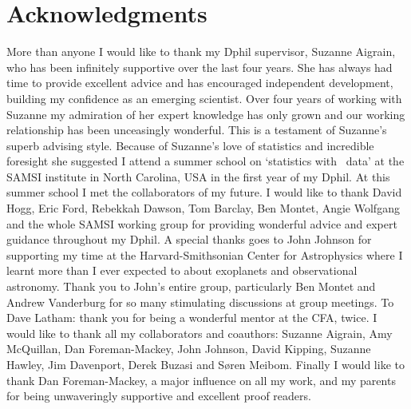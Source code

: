 % 

\cleardoublepage

\section*{Acknowledgments}

More than anyone I would like to thank my Dphil supervisor, Suzanne Aigrain,
who has been infinitely supportive over the last four years.
She has always had time to provide excellent advice and has encouraged
independent development, building my confidence as an emerging scientist.
Over four years of working with Suzanne my admiration of her expert knowledge
has only grown and our working relationship has been unceasingly wonderful.
This is a testament of Suzanne's superb advising style.
Because of Suzanne's love of statistics and incredible foresight she suggested
I attend a summer school on `statistics with \kepler\ data' at the SAMSI
institute in North Carolina, USA in the first year of my Dphil.
At this summer school I met the collaborators of my future.
I would like to thank David Hogg, Eric Ford, Rebekkah Dawson, Tom Barclay, Ben
Montet, Angie Wolfgang and the whole SAMSI working group for providing
wonderful advice and expert guidance throughout my Dphil.
A special thanks goes to John Johnson for supporting my time at the
Harvard-Smithsonian Center for Astrophysics where I learnt more than I ever
expected to about exoplanets and observational astronomy.
Thank you to John's entire group, particularly Ben Montet and Andrew
Vanderburg for so many stimulating discussions at group meetings.
To Dave Latham: thank you for being a wonderful mentor at the CFA, twice.
I would like to thank all my collaborators and coauthors: Suzanne Aigrain, Amy
McQuillan, Dan Foreman-Mackey, John Johnson, David Kipping, Suzanne Hawley,
Jim Davenport, Derek Buzasi and S{\o}ren Meibom.
Finally I would like to thank Dan Foreman-Mackey, a major influence on all my
work, and my parents for being unwaveringly supportive and excellent proof
readers.

